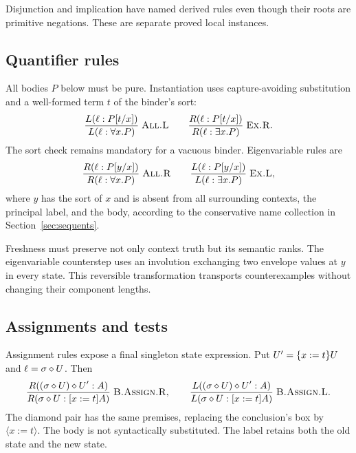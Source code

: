 Disjunction and implication have named derived rules even though their roots
are primitive negations. These are separate proved local instances.

\subsection{Quantifier rules}
All bodies $P$ below must be pure. Instantiation uses capture-avoiding
substitution and a well-formed term $t$ of the binder's sort:
\[
 \Rule{All.L}{L(\ann{\ell}{P[t/x]})}{L(\ann{\ell}{\forall x.P})}
 \qquad
 \Rule{Ex.R}{R(\ann{\ell}{P[t/x]})}{R(\ann{\ell}{\exists x.P})}.
\]
The sort check remains mandatory for a vacuous binder. Eigenvariable rules are
\[
 \Rule{All.R}{R(\ann{\ell}{P[y/x]})}{R(\ann{\ell}{\forall x.P})}
 \qquad
 \Rule{Ex.L}{L(\ann{\ell}{P[y/x]})}{L(\ann{\ell}{\exists x.P})},
\]
where $y$ has the sort of $x$ and is absent from all surrounding contexts,
the principal label, and the body, according to the conservative name
collection in Section~\ref{sec:sequents}.

Freshness must preserve not only context truth but its semantic ranks.
The eigenvariable counterstep uses an involution exchanging two envelope
values at $y$ in every state. This reversible transformation transports
counterexamples without changing their component lengths.

\subsection{Assignments and tests}
Assignment rules expose a final singleton state expression. Put
$U'=\upd{x:=t}{U}$ and $\ell=\sigma\jlabel U$. Then
\begin{gather*}
 \Rule{B.Assign.R}{R(\ann{(\sigma\jlabel U)\jlabel U'}{A})}
   {R(\ann{\sigma\jlabel U}{[x:=t]A})},\qquad
 \Rule{B.Assign.L}{L(\ann{(\sigma\jlabel U)\jlabel U'}{A})}
   {L(\ann{\sigma\jlabel U}{[x:=t]A})}.
\end{gather*}
The diamond pair has the same premises, replacing the conclusion's box by
$\langle x:=t\rangle$. The body is not syntactically substituted.
The label retains both the old state and the new state.

